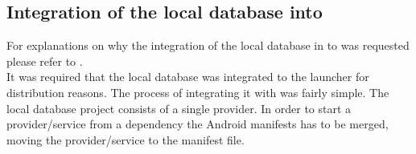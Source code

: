 \subsection{Integration of the local database into \launcher}
\label{sec:developments:localdbtolauncher}
For explanations on why the integration of the local database in to \launcher was requested please refer to .\\

It was required that the local database was integrated to the launcher for distribution reasons.
The process of integrating it with \launcher was fairly simple. 
The local database project consists of a single provider.
In order to start a provider/service from a dependency the Android manifests has to be merged, moving the provider/service to the \launcher manifest file.